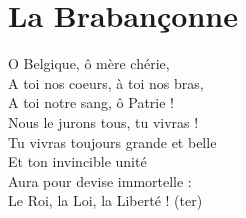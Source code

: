 \section*{La Brabançonne}
O Belgique, ô mère chérie,\\
A toi nos coeurs, à toi nos bras,\\
A toi notre sang, ô Patrie !\\
Nous le jurons tous, tu vivras !\\
Tu vivras toujours grande et belle\\
Et ton invincible unité\\
Aura pour devise immortelle :\\
Le Roi, la Loi, la Liberté ! (ter)\\

